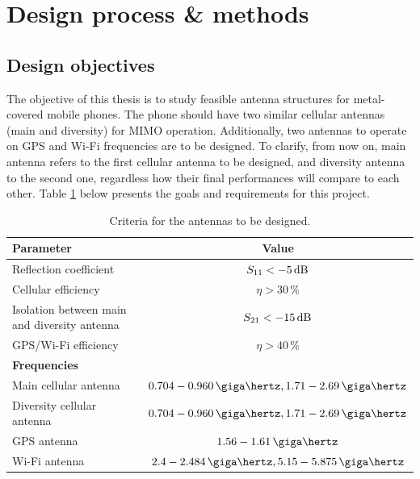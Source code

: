 \section{Design process \& methods}
\label{sec:ojectives}

\subsection{Design objectives}
The objective of this thesis is to study feasible antenna structures for metal-covered mobile phones. The phone should have two similar cellular antennas (main and diversity) for MIMO operation. Additionally, two antennas to operate on GPS and Wi-Fi frequencies are to be designed. To clarify, from now on, main antenna refers to the first cellular antenna to be designed, and diversity antenna to the second one, regardless how their final performances will compare to each other. Table \ref{tab:design_goals} below presents the goals and requirements for this project.

\begin{table}[H]
    \centering
    \caption{Criteria for the antennas to be designed.}
    \label{tab:design_goals}
    \begin{tabular}{|l|c|}
        \hline
         \textbf{Parameter} & \textbf{Value} \\
         \hline
         Reflection coefficient & $S_{11} < -5\,\mathrm{dB}$\\
         \hline
         Cellular efficiency & $\eta > 30\,\%$\\
         \hline
         Isolation between main and diversity antenna & $S_{21} < -15\,\mathrm{dB}$\\
         \hline
         GPS/Wi-Fi efficiency & $\eta > 40\,\%$\\
         \hline\hline
         \textbf{Frequencies} & \\
         \hline
         Main cellular antenna & $0.704-0.960\,\giga\hertz, 1.71-2.69\,\giga\hertz$\\
         \hline
         Diversity cellular antenna & $0.704-0.960\,\giga\hertz, 1.71-2.69\,\giga\hertz$\\
         \hline
         GPS antenna & $1.56-1.61\,\giga\hertz$\\
         \hline
         Wi-Fi antenna & $2.4-2.484\,\giga\hertz, 5.15-5.875\,\giga\hertz$\\
         \hline
    \end{tabular}
\end{table}


